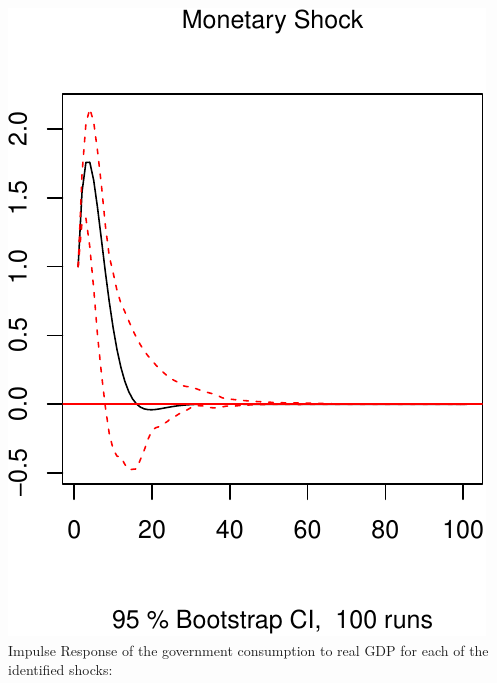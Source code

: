 \documentclass[11pt,preprint, authoryear]{elsarticle}
\numberwithin{equation}{section}
\numberwithin{figure}{section}
\numberwithin{table}{section}
\begin{document}
\includegraphics{TS_proj_files/figure-latex/unnamed-chunk-46-3.pdf}
\newpage Impulse Response of the government consumption to real GDP for
each of the identified shocks:
\end{document}
